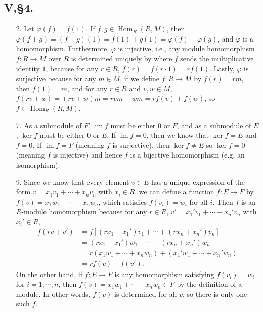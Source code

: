\documentclass[12pt]{article}
\DeclareMathOperator{\Hom}{Hom}
\DeclareMathOperator{\im}{im}
\begin{document}
\subsection*{V,\S4.}
\begin{enumerate}
    \item[2.]
        Let $\varphi(f) = f(1)$. If $f, g \in \Hom_R(R, M)$, then $\varphi(f + g) = (f + g)(1) = f(1) + g(1) = \varphi(f) + \varphi(g)$, and $\varphi$ is a homomorphism. Furthermore, $\varphi$ is injective, i.e., any module homomorphism $f : R \to M$ over $R$ is determined uniquely by where $f$ sends the multiplicative identity $1$, because for any $r \in R$, $f(r) = f(r \cdot 1) = rf(1)$. Lastly, $\varphi$ is surjective because for any $m \in M$, if we define $f : R \to M$ by $f(r) = rm$, then $f(1) = m$, and for any $r \in R$ and $v, w \in M$, $f(rv + w) = (rv + w)m = rvm + wm = rf(v) + f(w)$, so $f \in \Hom_R(R, M)$.

    \item[7.]
        As a submodule of $F$, $\im f$ must be either $0$ or $F$, and as a submodule of $E$, $\ker f$ must be either $0$ or $E$. If $\im f = 0$, then we know that $\ker f = E$ and $f = 0$. If $\im f = F$ (meaning $f$ is surjective), then $\ker f \neq E$ so $\ker f = 0$ (meaning $f$ is injective) and hence $f$ is a bijective homomorphism (e.g. an isomorphism).

    \item[9.]
        Since we know that every element $v \in E$ has a unique expression of the form $v = x_1 v_1 + \cdots + x_n v_n$ with $x_i \in R$, we can define a function $f : E \to F$ by $f(v) = x_1 w_1 + \cdots + x_n w_n$, which satisfies $f(v_i) = w_i$ for all $i$. Then $f$ is an $R$-module homomorphism because for any $r \in R$, $v' = x_1' v_1 + \cdots + x_n' v_n$ with $x_i' \in R$,
        \begin{align*}
            f(rv + v') &= f[(rx_1 + x_1')v_1 + \cdots + (rx_n + x_n')v_n] \\
            &= (rx_1 + x_1')w_1 + \cdots + (rx_n + x_n')w_n \\
            &= r(x_1 w_1 + \cdots + x_n w_n) + (x_1' w_1 + \cdots + x_n' w_n) \\
            &= rf(v) + f(v').
        \end{align*}
        On the other hand, if $f : E \to F$ is any homomorphism satisfying $f(v_i) = w_i$ for $i = 1, \cdots, n$, then $f(v) = x_1 w_1 + \cdots + x_n w_n \in F$ by the definition of a module. In other words, $f(v)$ is determined for all $v$, so there is only one such $f$.


\end{enumerate}
\end{document}
